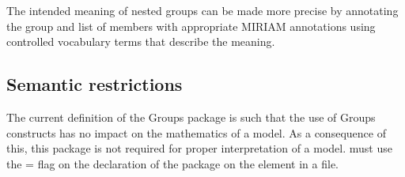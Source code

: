 The intended meaning of nested groups can be made more precise by annotating the group and list of members with appropriate MIRIAM annotations using controlled vocabulary terms that describe the meaning.


\subsection{Semantic restrictions}
\label{semantic-restrictions}

The current definition of the Groups package is such that the use of Groups constructs has no impact on the mathematics of a model.  As a consequence of this, this package is not required for proper interpretation of a model.  must use the = flag on the declaration of the package on the  element in a file.

